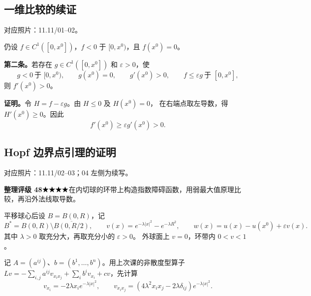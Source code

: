 \documentclass[UTF8,a4paper,11pt,fontset=fandol]{ctexart}
\newcommand{\source}[1]{{\small\color{notegray}对应照片：#1。}\par}
\newcommand{\proofstars}[1]{\ensuremath{%
\ifnum#1>0\relax\bigstar\fi
\ifnum#1>1\relax\bigstar\fi
\ifnum#1>2\relax\bigstar\fi
\ifnum#1>3\relax\bigstar\fi
\ifnum#1>4\relax\bigstar\fi}}
\newcommand{\proofrating}[3]{\par{\small\color{proofblue}%
\textbf{整理评级 #1}\enspace\proofstars{#2}\quad #3\par}}
\begin{document}
\subsection*{一维比较的续证}
\source{11.11/01--02}
仍设 $f\in C^1([0,x^0])$，$f<0$ 于 $[0,x^0)$，且 $f(x^0)=0$。

\textbf{第二条。}若存在 $g\in C^1([0,x^0])$ 和 $\varepsilon>0$，使
\[
g<0\ \text{于 }[0,x^0),\qquad
g(x^0)=0,\qquad g'(x^0)>0,\qquad
f\leq\varepsilon g\ \text{于 }[0,x^0],
\]
则 $f'(x^0)>0$。

\textbf{证明。}令 $H=f-\varepsilon g$。由 $H\leq0$ 及 $H(x^0)=0$，
在右端点取左导数，得 $H'(x^0)\geq0$。因此
\[
f'(x^0)\geq\varepsilon g'(x^0)>0.
\]

\subsection*{Hopf 边界点引理的证明}
\source{11.11/02--03；04 左侧为续写}
\proofrating{48}{4}{在内切球的环带上构造指数障碍函数，用弱最大值原理比较，再沿外法线取导数。}
平移球心后设 $B=B(0,R)$，记
\[
B^*=B(0,R)\setminus\overline{B(0,R/2)},\qquad
v(x)=e^{-\lambda |x|^2}-e^{-\lambda R^2},
\qquad w(x)=u(x)-u(x^0)+\varepsilon v(x).
\]
其中 $\lambda>0$ 取充分大，再取充分小的 $\varepsilon>0$。
外球面上 $v=0$，环带内 $0<v<1$。

\begin{center}
\end{center}

记 $A=(a^{ij})$、$b=(b^1,\ldots,b^n)$。用上次课的非散度型算子
$Lv=-\sum_{i,j}a^{ij}v_{x_ix_j}+\sum_i b^i v_{x_i}+cv$，先计算
\[
v_{x_i}=-2\lambda x_i e^{-\lambda|x|^2},\qquad
v_{x_ix_j}=(4\lambda^2x_ix_j-2\lambda\delta_{ij})e^{-\lambda|x|^2}.
\]

\newpage
\end{document}
